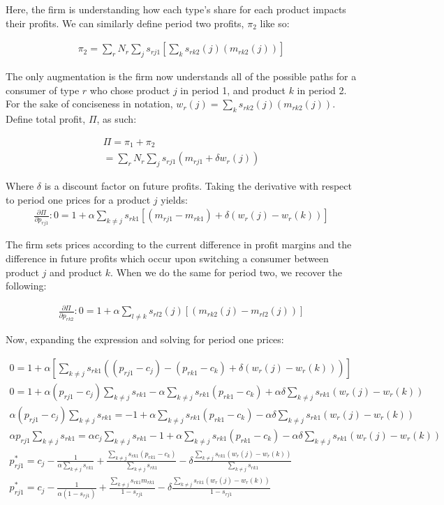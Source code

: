 \documentclass[11pt]{article}
\theoremstyle{definition}
\theoremstyle{remark}
\begin{document}
Here, the firm is understanding how each type's share for each product impacts their profits. We can similarly define period two profits, $\pi_2$ like so:

\begin{gather*}
  \pi_2 = \sum_rN_r\sum_js_{rj1}[\sum_ks_{rk2}(j)(m_{rk2}(j))]
\end{gather*}

The only augmentation is the firm now understands all of the possible paths for a consumer of type $r$ who chose product $j$ in period 1, and product $k$ in period 2. For the sake of conciseness in notation, $w_r(j) = \sum_ks_{rk2}(j)(m_{rk2}(j))$. Define total profit, $\Pi$, as such:

\begin{gather*}
  \Pi = \pi_1 + \pi_2 \\
  = \sum_rN_r\sum_js_{rj1}(m_{rj1} + \delta w_r(j))
\end{gather*}

Where $\delta$ is a discount factor on future profits. Taking the derivative with respect to period one prices for a product $j$ yields:
\begin{gather*}
  \frac{\partial \Pi}{\partial p_{rj1}}: 0 = 1 + \alpha\sum_{k\ne j}s_{rk1}[(m_{rj1} - m_{rk1}) + \delta(w_r(j) - w_r(k))]
\end{gather*}

The firm sets prices according to the current difference in profit margins and the difference in future profits which occur upon switching a consumer between product $j$ and product $k$. When we do the same for period two, we recover the following:

\begin{gather*}
  \frac{\partial \Pi}{\partial p_{rk2}}: 0= 1+\alpha\sum_{l\ne k}s_{rl2}(j)[(m_{rk2}(j) - m_{rl2}(j))]
\end{gather*}

Now, expanding the expression and solving for period one prices:

\begin{gather*}
  0 = 1 + \alpha[\sum_{k\ne j}s_{rk1}((p_{rj1} - c_j) - (p_{rk1} - c_k) + \delta(w_r(j) - w_r(k)))] \\
  0 = 1 + \alpha(p_{rj1} - c_j)\sum_{k\ne j}s_{rk1} - \alpha\sum_{k\ne j}s_{rk1}(p_{rk1} - c_k) + \alpha\delta\sum_{k\ne j}s_{rk1}(w_r(j) - w_r(k)) \\
  \alpha(p_{rj1} - c_j)\sum_{k\ne j}s_{rk1} = -1 + \alpha\sum_{k\ne j}s_{rk1}(p_{rk1} - c_k) - \alpha\delta\sum_{k\ne j}s_{rk1}(w_r(j) - w_r(k)) \\
  \alpha p_{rj1}\sum_{k\ne j}s_{rk1} = \alpha c_j\sum_{k\ne j}s_{rk1} - 1 + \alpha\sum_{k\ne j}s_{rk1}(p_{rk1} - c_k) - \alpha\delta\sum_{k\ne j}s_{rk1}(w_r(j) - w_r(k)) \\
  p^*_{rj1} = c_j - \frac{1}{\alpha\sum_{k\ne j}s_{rk1}} + \frac{\sum_{k\ne j}s_{rk1}(p_{rk1} - c_k)}{\sum_{k\ne j}s_{rk1}} - \delta\frac{\sum_{k\ne j}s_{rk1}(w_r(j) - w_r(k))}{\sum_{k\ne j}s_{rk1}} \\
  p^*_{rj1} = c_j - \frac{1}{\alpha(1-s_{rj1})} + \frac{\sum_{k\ne j}s_{rk1}m_{rk1}}{1-s_{rj1}} - \delta\frac{\sum_{k\ne j}s_{rk1}(w_r(j) - w_r(k))}{1-s_{rj1}} \\
\end{gather*}
\end{document}
